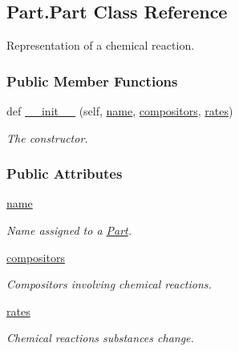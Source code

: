 \hypertarget{classPart_1_1Part}{}\subsection{Part.\+Part Class Reference}
\label{classPart_1_1Part}


Representation of a chemical reaction.  


\subsubsection*{Public Member Functions}
\begin{DoxyCompactItemize}
\item 
def \hyperlink{classPart_1_1Part_a349977d3234782ddec178d8eb087f0fa}{\+\_\+\+\_\+init\+\_\+\+\_\+} (self, \hyperlink{classPart_1_1Part_aa6357537859dfbc7c08863a542bd1282}{name}, \hyperlink{classPart_1_1Part_a5b12b62fe1ad5a2a2a98fa631659992b}{compositors}, \hyperlink{classPart_1_1Part_a3cf6cc7f4a7940f3a4a8bb238fee7509}{rates})
\begin{DoxyCompactList}\small\item\em The constructor. \end{DoxyCompactList}\end{DoxyCompactItemize}
\subsubsection*{Public Attributes}
\begin{DoxyCompactItemize}
\item 
\hyperlink{classPart_1_1Part_aa6357537859dfbc7c08863a542bd1282}{name}
\begin{DoxyCompactList}\small\item\em Name assigned to a \hyperlink{classPart_1_1Part}{Part}. \end{DoxyCompactList}\item 
\hyperlink{classPart_1_1Part_a5b12b62fe1ad5a2a2a98fa631659992b}{compositors}
\begin{DoxyCompactList}\small\item\em Compositors involving chemical reactions. \end{DoxyCompactList}\item 
\hyperlink{classPart_1_1Part_a3cf6cc7f4a7940f3a4a8bb238fee7509}{rates}
\begin{DoxyCompactList}\small\item\em Chemical reactions substances change. \end{DoxyCompactList}\end{DoxyCompactItemize}


